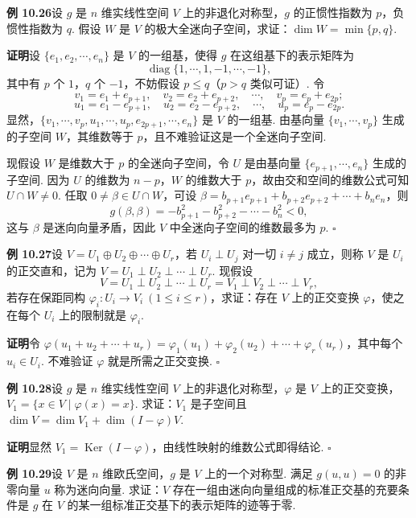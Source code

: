 \documentclass[UTF8,12pt,a4paper,fontset=fandol]{ctexart}
\begin{document}
\noindent\textbf{例 10.26}\quad 设 $g$ 是 $n$ 维实线性空间 $V$ 上的非退化对称型，$g$ 的正惯性指数为 $p$，负惯性指数为 $q$. 假设 $W$ 是 $V$ 的极大全迷向子空间，求证：$\dim W=\min\{p,q\}$.

\noindent\textbf{证明}\quad 设 $\{e_1,e_2,\cdots,e_n\}$ 是 $V$ 的一组基，使得 $g$ 在这组基下的表示矩阵为
\[
\operatorname{diag}\{1,\cdots,1,-1,\cdots,-1\},
\]
其中有 $p$ 个 $1$，$q$ 个 $-1$，不妨假设 $p\le q$（$p>q$ 类似可证）. 令
\[
v_1=e_1+e_{p+1},\quad v_2=e_2+e_{p+2},\quad \cdots,\quad v_p=e_p+e_{2p};
\]
\[
u_1=e_1-e_{p+1},\quad u_2=e_2-e_{p+2},\quad \cdots,\quad u_p=e_p-e_{2p}.
\]
显然，$\{v_1,\cdots,v_p,u_1,\cdots,u_p,e_{2p+1},\cdots,e_n\}$ 是 $V$ 的一组基. 由基向量 $\{v_1,\cdots,v_p\}$ 生成的子空间 $W$，其维数等于 $p$，且不难验证这是一个全迷向子空间.

现假设 $W$ 是维数大于 $p$ 的全迷向子空间，令 $U$ 是由基向量 $\{e_{p+1},\cdots,e_n\}$ 生成的子空间. 因为 $U$ 的维数为 $n-p$，$W$ 的维数大于 $p$，故由交和空间的维数公式可知 $U\cap W\ne0$. 任取 $0\ne\beta\in U\cap W$，可设 $\beta=b_{p+1}e_{p+1}+b_{p+2}e_{p+2}+\cdots+b_ne_n$，则
\[
g(\beta,\beta)=-b_{p+1}^2-b_{p+2}^2-\cdots-b_n^2<0,
\]
这与 $\beta$ 是迷向向量矛盾，因此 $V$ 中全迷向子空间的维数最多为 $p$. $\square$

\noindent\textbf{例 10.27}\quad 设 $V=U_1\oplus U_2\oplus\cdots\oplus U_r$，若 $U_i\perp U_j$ 对一切 $i\ne j$ 成立，则称 $V$ 是 $U_i$ 的正交直和，记为 $V=U_1\perp U_2\perp\cdots\perp U_r$. 现假设
\[
V=U_1\perp U_2\perp\cdots\perp U_r=V_1\perp V_2\perp\cdots\perp V_r,
\]
若存在保距同构 $\varphi_i:U_i\to V_i\ (1\le i\le r)$，求证：存在 $V$ 上的正交变换 $\varphi$，使之在每个 $U_i$ 上的限制就是 $\varphi_i$.

\noindent\textbf{证明}\quad 令 $\varphi(u_1+u_2+\cdots+u_r)=\varphi_1(u_1)+\varphi_2(u_2)+\cdots+\varphi_r(u_r)$，其中每个 $u_i\in U_i$. 不难验证 $\varphi$ 就是所需之正交变换. $\square$

\noindent\textbf{例 10.28}\quad 设 $g$ 是 $n$ 维实线性空间 $V$ 上的非退化对称型，$\varphi$ 是 $V$ 上的正交变换，$V_1=\{x\in V\mid \varphi(x)=x\}$. 求证：$V_1$ 是子空间且 $\dim V=\dim V_1+\dim(I-\varphi)V$.

\noindent\textbf{证明}\quad 显然 $V_1=\operatorname{Ker}(I-\varphi)$，由线性映射的维数公式即得结论. $\square$

\noindent\textbf{例 10.29}\quad 设 $V$ 是 $n$ 维欧氏空间，$g$ 是 $V$ 上的一个对称型. 满足 $g(u,u)=0$ 的非零向量 $u$ 称为迷向向量. 求证：$V$ 存在一组由迷向向量组成的标准正交基的充要条件是 $g$ 在 $V$ 的某一组标准正交基下的表示矩阵的迹等于零.
\end{document}
